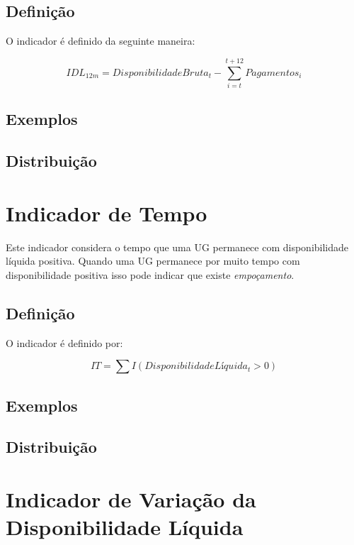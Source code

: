 \documentclass[
]{book}
\begin{document}
\hypertarget{definiuxe7uxe3o-3}{%
\subsection{Definição}\label{definiuxe7uxe3o-3}}

O indicador é definido da seguinte maneira:

\[IDL_{12m} = DisponibilidadeBruta_t - \sum_{i=t}^{t+12}Pagamentos_i\]

\hypertarget{exemplos-2}{%
\subsection{Exemplos}\label{exemplos-2}}

\hypertarget{distribuiuxe7uxe3o-1}{%
\subsection{Distribuição}\label{distribuiuxe7uxe3o-1}}

\hypertarget{indicador-de-tempo}{%
\section{Indicador de Tempo}\label{indicador-de-tempo}}

Este indicador considera o tempo que uma UG permanece com disponibilidade líquida positiva. Quando uma UG permanece por muito tempo com disponibilidade positiva isso pode indicar que existe \emph{empoçamento}.

\hypertarget{definiuxe7uxe3o-4}{%
\subsection{Definição}\label{definiuxe7uxe3o-4}}

O indicador é definido por:

\[IT = \sum I(DisponibilidadeLíquida_t > 0)\]

\hypertarget{exemplos-3}{%
\subsection{Exemplos}\label{exemplos-3}}

\hypertarget{distribuiuxe7uxe3o-2}{%
\subsection{Distribuição}\label{distribuiuxe7uxe3o-2}}

\hypertarget{indicador-de-variauxe7uxe3o-da-disponibilidade-luxedquida}{%
\section{Indicador de Variação da Disponibilidade Líquida}\label{indicador-de-variauxe7uxe3o-da-disponibilidade-luxedquida}}
\end{document}
